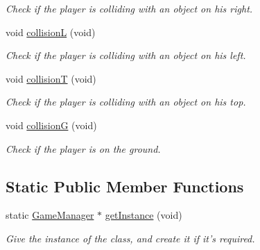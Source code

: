\begin{DoxyCompactItemize}
\begin{DoxyCompactList}\small\item\em Check if the player is colliding with an object on his right. \end{DoxyCompactList}\item 
\hypertarget{class_game_manager_abafc8b11a6ea10a83b1e0f218fd5133d}{void \hyperlink{class_game_manager_abafc8b11a6ea10a83b1e0f218fd5133d}{collision\-L} (void)}\label{class_game_manager_abafc8b11a6ea10a83b1e0f218fd5133d}

\begin{DoxyCompactList}\small\item\em Check if the player is colliding with an object on his left. \end{DoxyCompactList}\item 
\hypertarget{class_game_manager_a7aaec061aabf7f4e5ba8fed7b7415b84}{void \hyperlink{class_game_manager_a7aaec061aabf7f4e5ba8fed7b7415b84}{collision\-T} (void)}\label{class_game_manager_a7aaec061aabf7f4e5ba8fed7b7415b84}

\begin{DoxyCompactList}\small\item\em Check if the player is colliding with an object on his top. \end{DoxyCompactList}\item 
\hypertarget{class_game_manager_a6848d5f06fd715a809179df02139bd3a}{void \hyperlink{class_game_manager_a6848d5f06fd715a809179df02139bd3a}{collision\-G} (void)}\label{class_game_manager_a6848d5f06fd715a809179df02139bd3a}

\begin{DoxyCompactList}\small\item\em Check if the player is on the ground. \end{DoxyCompactList}\end{DoxyCompactItemize}
\subsection*{Static Public Member Functions}
\begin{DoxyCompactItemize}
\item 
static \hyperlink{class_game_manager}{Game\-Manager} $\ast$ \hyperlink{class_game_manager_aee0b0f084c86ece89f9f49353ef75e6e}{get\-Instance} (void)
\begin{DoxyCompactList}\small\item\em Give the instance of the class, and create it if it's required. \end{DoxyCompactList}\end{DoxyCompactItemize}
